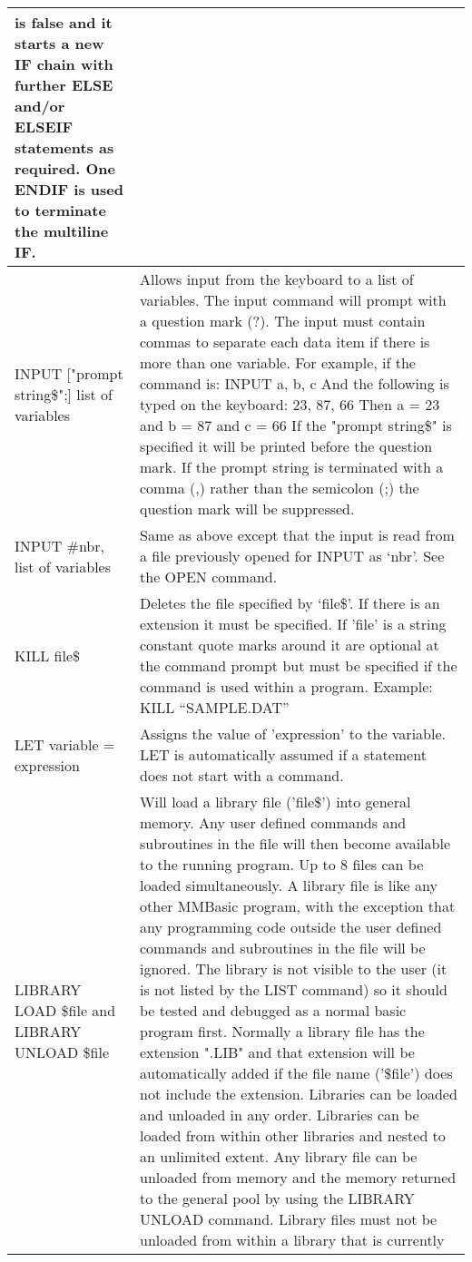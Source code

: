 \documentclass[11pt,fleqn]{book} %
\numberwithin{equation}{section} %
\numberwithin{figure}{section} %
\numberwithin{table}{section} %
\begin{document}
\begin{table}[]
\begin{tabular}{|p{4cm}|p{10cm}|}
is false and it starts a new IF chain with further ELSE and/or ELSEIF
statements as required.
One ENDIF is used to terminate the multiline IF.
\\ \hline
INPUT ["prompt string\$";]
list of variables
& Allows input from the keyboard to a list of variables. The input
command will prompt with a question mark (?).
The input must contain commas to separate each data item if there is
more than one variable.
For example, if the command is: INPUT a, b, c
And the following is typed on the keyboard: 23, 87, 66
Then a = 23 and b = 87 and c = 66
If the "prompt string\$" is specified it will be printed before the question
mark. If the prompt string is terminated with a comma (,) rather than the
semicolon (;) the question mark will be suppressed.
\\ \hline
INPUT \#nbr,
list of variables
& Same as above except that the input is read from a file previously opened
for INPUT as ‘nbr’. See the OPEN command.
\\ \hline
KILL file\$ & Deletes the file specified by ‘file\$’. If there is an extension it must be
specified.
If 'file' is a string constant quote marks around it are optional at the
command prompt but must be specified if the command is used within a
program. Example: KILL “SAMPLE.DAT”
\\ \hline
LET variable = expression & Assigns the value of 'expression' to the variable. LET is automatically
assumed if a statement does not start with a command.
\\ \hline
LIBRARY LOAD \$file
and
LIBRARY UNLOAD \$file
& Will load a library file ('file\$') into general memory. Any user defined
commands and subroutines in the file will then become available to the
running program. Up to 8 files can be loaded simultaneously.
A library file is like any other MMBasic program, with the exception
that any programming code outside the user defined commands and
subroutines in the file will be ignored. The library is not visible to the
user (it is not listed by the LIST command) so it should be tested and
debugged as a normal basic program first. Normally a library file has
the extension ".LIB" and that extension will be automatically added if
the file name ('\$file') does not include the extension.
Libraries can be loaded and unloaded in any order. Libraries can be
loaded from within other libraries and nested to an unlimited extent.
Any library file can be unloaded from memory and the memory returned
to the general pool by using the LIBRARY UNLOAD command.
Library files must not be unloaded from within a library that is currently

\end{tabular}
\end{table}
\end{document}

